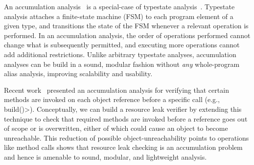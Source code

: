 An accumulation analysis~\cite{KelloggRSSE2020}
is a special-case of typestate analysis~\cite{StromY86}.
Typestate analysis attaches a finite-state machine (FSM)
to each program element of a given type, and transitions the state of the
FSM whenever a relevant operation is performed.
In an accumulation analysis,
the order of operations performed cannot change what is subsequently
permitted, and executing more operations cannot add additional
restrictions.  Unlike arbitrary typestate analyses, accumulation analyses can
be build in a sound, modular fashion without \emph{any} whole-program alias
analysis, improving scalability and usability.

Recent work~\cite{KelloggRSSE2020} presented an accumulation analysis for
verifying that certain methods are invoked on each object reference
before a specific call (e.g., \<build()>).  Conceptually,
we can build a resource leak verifier by extending this technique
to check that required methods are invoked before a reference goes out
of scope or is overwritten, either of which could cause an object to become unreachable.
This reduction of possible object-unreachability points to operations like
method calls shows that resource leak checking is an accumulation
problem and hence is amenable to sound, modular, and lightweight analysis.

